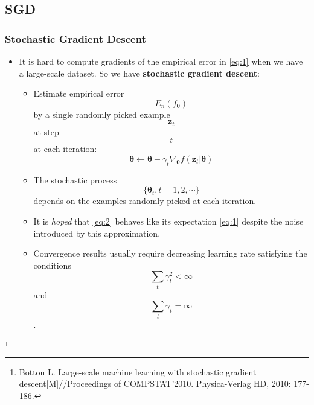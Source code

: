 \documentclass[10pt]{beamer}
\theoremstyle{mystyle}
\def\bb#1{\mathbf{#1}}
\newcommand{\bst}{\boldsymbol\theta}
\newcommand\blfootnote[1]{%
  \begingroup
  \renewcommand\thefootnote{}\footnote[frame]{#1}%
  \addtocounter{footnote}{-1}%
  \endgroup
}
\theoremstyle{mystyle}
\begin{document}
\subsection{SGD}
\begin{frame}
	\frametitle{Stochastic Gradient Descent}
	\begin{itemize}
		\item It is hard to compute gradients of the empirical error in \eqref{eq:1} when we have a large-scale dataset. So we have {\bf stochastic gradient descent}:
		\begin{itemize}
			\item Estimate empirical error $$ E_n(f_{\bst}) $$ by a single randomly picked example $$ \bb z_t $$ at step $$ t $$ at each iteration: 
			\begin{equation}\label{eq:2}
				\bst\leftarrow\bst-\gamma_t\nabla_{\bst}f(\bb{z}_t\vert\bst)
			\end{equation}
			\item The stochastic process $$ \{\bst_t, t=1,2,\cdots\} $$ depends on the examples randomly picked at each iteration.
			\item It is {\it hoped} that \eqref{eq:2} behaves like its expectation \eqref{eq:1} despite the noise introduced by this approximation.
			\item Convergence results usually require decreasing learning rate satisfying the conditions $$ \sum_t\gamma_t^2<\infty $$ and $$ \sum_t\gamma_t=\infty $$.
		\end{itemize}
	
	\end{itemize}
	\blfootnote{Bottou L. Large-scale machine learning with stochastic gradient descent[M]//Proceedings of COMPSTAT'2010. Physica-Verlag HD, 2010: 177-186.}
\end{frame}
\end{document}
